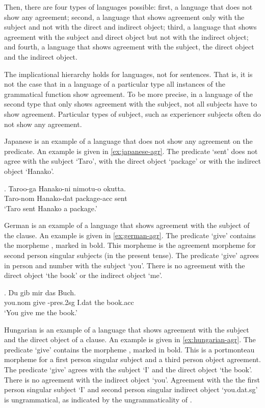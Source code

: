 Then, there are four types of languages possible: first, a language that does not show any agreement; second, a language that shows agreement only with the subject and not with the direct and indirect object; third, a language that shows agreement with the subject and direct object but not with the indirect object; and fourth, a language that shows agreement with the subject, the direct object and the indirect object.

The implicational hierarchy holds for languages, not for sentences. That is, it is not the case that in a language of a particular type all instances of the grammatical function show agreement. To be more precise, in a language of the second type that only shows agreement with the subject, not all subjects have to show agreement. Particular types of subject, such as experiencer subjects often do not show any agreement.

Japanese is an example of a language that does not show any agreement on the predicate. An example is given in \ref{ex:japanese-agr}. The predicate  `sent' does not agree with the subject  `Taro', with the direct object  `package' or with the indirect object  `Hanako'.

\exg. Taroo-ga Hanako-ni nimotu-o okutta.\\
 Taro-\ac{nom} Hanako-\ac{dat} package-\ac{acc} sent\\
 `Taro sent Hanako a package.' \label{ex:japanese-agr}

German is an example of a language that shows agreement with the subject of the clause. An example is given in \ref{ex:german-agr}. The predicate  `give' contains the morpheme , marked in bold. This morpheme is the agreement morpheme for second person singular subjects (in the present tense). The predicate  `give' agrees in person and number with the subject  `you'. There is no agreement with the direct object  `the book' or the indirect object  `me'.

\exg. Du gib  mir {das Buch}.\\
 you.\ac{nom} give -\ac{pres}.2\ac{sg} I.\ac{dat} {the book.\ac{acc}}\\
 `You give me the book.' \label{ex:german-agr}

Hungarian is an example of a language that shows agreement with the subject and the direct object of a clause. An example is given in \ref{ex:hungarian-agr}. The predicate  `give' contains the morpheme , marked in bold. This is a portmonteau morpheme for a first person singular subject and a third person object agreement. The predicate  `give' agrees with the subject  `I' and the direct object  `the book'. There is no agreement with the indirect object  `you'. Agreement with the the first person singular subject  `I' and second person singular indirect object  `you.\ac{dat}.\ac{sg}' is ungrammatical, as indicated by the ungrammaticality of .

